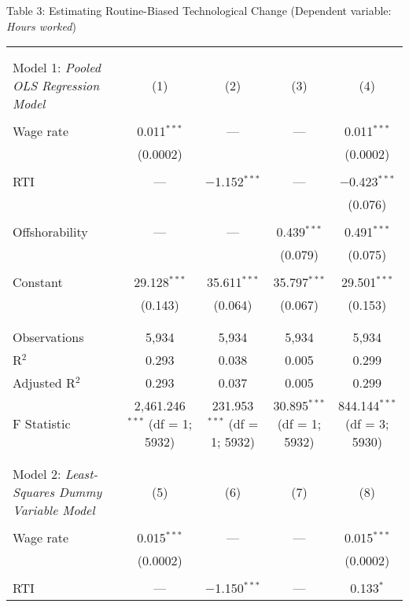 \documentclass[12pt]{article}
\begin{document}
\begin{table}[!htbp] \centering 
Table 3: Estimating Routine-Biased Technological Change (Dependent variable: \textit{Hours worked})
  \label{} 
\tiny
\begin{tabular}{@{\extracolsep{5pt}}lcccc} 
\hline
\hline \\[-1.8ex] 
\\[-1.8ex] Model 1: \textit{Pooled OLS Regression Model} & (1) & (2) & (3) & (4) \\ 
\hline \\[-1.8ex] 
Wage rate & 0.011$^{***}$ & --- & --- & 0.011$^{***}$ \\ 
  & (0.0002) & & & (0.0002) \\ 
  & & & & \\ 
 RTI & --- & $-$1.152$^{***}$ & --- & $-$0.423$^{***}$ \\ 
  & & & & (0.076) \\ 
  & & & & \\ 
 Offshorability & --- & --- & 0.439$^{***}$ & 0.491$^{***}$ \\ 
  & & & (0.079) & (0.075) \\ 
  & & & & \\ 
 Constant & 29.128$^{***}$ & 35.611$^{***}$ & 35.797$^{***}$ &29.501$^{***}$ \\ 
  & (0.143) & (0.064) & (0.067) & (0.153) \\ 
 & & & & \\
\hline \\[-1.8ex] 
Observations & 5,934 & 5,934 & 5,934 & 5,934 \\ 
R$^{2}$ & 0.293 & 0.038 & 0.005 & 0.299 \\ 
Adjusted R$^{2}$ & 0.293 & 0.037 & 0.005 & 0.299 \\
F Statistic & 2,461.246$^{***}$ (df = 1; 5932) & 231.953$^{***}$ (df = 1; 5932) & 30.895$^{***}$ (df = 1; 5932) & 844.144$^{***}$ (df = 3; 5930) \\ 
\hline 
\hline \\[-1.8ex] 
\\[-1.8ex] Model 2: \textit{Least-Squares Dummy Variable Model} & (5) & (6) & (7) & (8) \\
\hline \\[-1.8ex] 
Wage rate & 0.015$^{***}$ & --- & --- & 0.015$^{***}$ \\ 
  & (0.0002) & & & (0.0002) \\ 
  & & & & \\ 
 RTI & --- & $-$1.150$^{***}$ & --- & 0.133$^{*}$ \\ 

\end{tabular}
\end{table}
\end{document}
